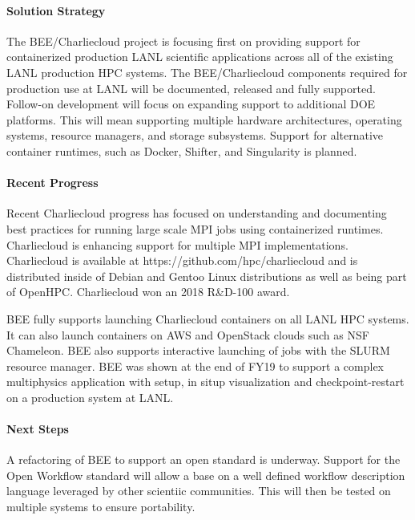 \paragraph{Solution Strategy}
The BEE/Charliecloud project is focusing first on providing support for
containerized production LANL scientific applications across all of the
existing LANL production HPC systems.  The BEE/Charliecloud components required
for production use at LANL will be documented, released and fully supported.
Follow-on development will focus on expanding support to additional DOE
platforms.  This will mean supporting multiple hardware architectures,
operating systems, resource managers, and storage subsystems.  Support for
alternative container runtimes, such as Docker, Shifter, and Singularity is
planned.

\paragraph{Recent Progress}
%
Recent Charliecloud progress has focused on understanding and documenting best
practices for running large scale MPI jobs using containerized runtimes.
Charliecloud is enhancing support for multiple MPI implementations.
Charliecloud is available at https://github.com/hpc/charliecloud and is
distributed inside of Debian and Gentoo Linux distributions as well as being
part of OpenHPC.  Charliecloud won an 2018 R\&D-100 award.

BEE fully supports launching Charliecloud containers on all LANL HPC systems.
It can also launch containers on AWS and OpenStack clouds such as NSF
Chameleon.  BEE also supports interactive launching of jobs with the SLURM
resource manager. BEE was shown at the end of FY19 to support a complex multiphysics application with setup, in situp visualization and checkpoint-restart on a production system at LANL.

\paragraph{Next Steps}
A refactoring of BEE to support an open standard is underway. Support for the Open Workflow standard will allow a base on a well defined workflow description language leveraged by other scientiic communities. This will then be tested on multiple systems to ensure portability.
